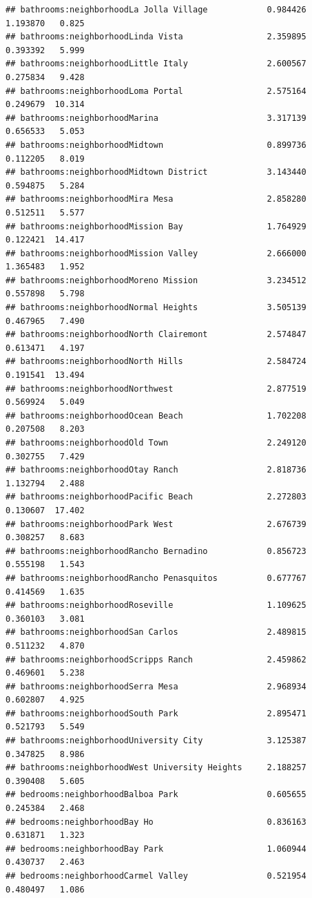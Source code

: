\documentclass[
]{book}
\begin{document}
\begin{verbatim}
## bathrooms:neighborhoodLa Jolla Village            0.984426   1.193870   0.825
## bathrooms:neighborhoodLinda Vista                 2.359895   0.393392   5.999
## bathrooms:neighborhoodLittle Italy                2.600567   0.275834   9.428
## bathrooms:neighborhoodLoma Portal                 2.575164   0.249679  10.314
## bathrooms:neighborhoodMarina                      3.317139   0.656533   5.053
## bathrooms:neighborhoodMidtown                     0.899736   0.112205   8.019
## bathrooms:neighborhoodMidtown District            3.143440   0.594875   5.284
## bathrooms:neighborhoodMira Mesa                   2.858280   0.512511   5.577
## bathrooms:neighborhoodMission Bay                 1.764929   0.122421  14.417
## bathrooms:neighborhoodMission Valley              2.666000   1.365483   1.952
## bathrooms:neighborhoodMoreno Mission              3.234512   0.557898   5.798
## bathrooms:neighborhoodNormal Heights              3.505139   0.467965   7.490
## bathrooms:neighborhoodNorth Clairemont            2.574847   0.613471   4.197
## bathrooms:neighborhoodNorth Hills                 2.584724   0.191541  13.494
## bathrooms:neighborhoodNorthwest                   2.877519   0.569924   5.049
## bathrooms:neighborhoodOcean Beach                 1.702208   0.207508   8.203
## bathrooms:neighborhoodOld Town                    2.249120   0.302755   7.429
## bathrooms:neighborhoodOtay Ranch                  2.818736   1.132794   2.488
## bathrooms:neighborhoodPacific Beach               2.272803   0.130607  17.402
## bathrooms:neighborhoodPark West                   2.676739   0.308257   8.683
## bathrooms:neighborhoodRancho Bernadino            0.856723   0.555198   1.543
## bathrooms:neighborhoodRancho Penasquitos          0.677767   0.414569   1.635
## bathrooms:neighborhoodRoseville                   1.109625   0.360103   3.081
## bathrooms:neighborhoodSan Carlos                  2.489815   0.511232   4.870
## bathrooms:neighborhoodScripps Ranch               2.459862   0.469601   5.238
## bathrooms:neighborhoodSerra Mesa                  2.968934   0.602807   4.925
## bathrooms:neighborhoodSouth Park                  2.895471   0.521793   5.549
## bathrooms:neighborhoodUniversity City             3.125387   0.347825   8.986
## bathrooms:neighborhoodWest University Heights     2.188257   0.390408   5.605
## bedrooms:neighborhoodBalboa Park                  0.605655   0.245384   2.468
## bedrooms:neighborhoodBay Ho                       0.836163   0.631871   1.323
## bedrooms:neighborhoodBay Park                     1.060944   0.430737   2.463
## bedrooms:neighborhoodCarmel Valley                0.521954   0.480497   1.086

\end{verbatim}
\end{document}
